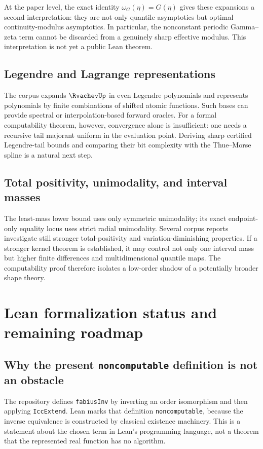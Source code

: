 \documentclass[11pt,oneside]{article}
\theoremstyle{definition}
\theoremstyle{remark}
\numberwithin{equation}{section}
\begin{document}
At the paper level, the exact identity $\omega_G(\eta)=G(\eta)$ gives these
expansions a second interpretation: they are not only quantile asymptotics but
optimal continuity-modulus asymptotics.  In particular, the nonconstant
periodic Gamma--zeta term cannot be discarded from a genuinely sharp
effective modulus.  This interpretation is not yet a public Lean theorem.

\subsection{Legendre and Lagrange representations}

The corpus expands $\RvachevUp$ in even Legendre polynomials and represents
polynomials by finite combinations of shifted atomic functions.  Such bases
can provide spectral or interpolation-based forward oracles.  For a formal
computability theorem, however, convergence alone is insufficient: one needs
a recursive tail majorant uniform in the evaluation point.  Deriving sharp
certified Legendre-tail bounds and comparing their bit complexity with the
Thue--Morse spline is a natural next step.

\subsection{Total positivity, unimodality, and interval masses}

The least-mass lower bound uses only symmetric unimodality; its exact
endpoint-only equality locus uses strict radial unimodality.  Several corpus
reports investigate still stronger total-positivity and variation-diminishing
properties.  If a stronger kernel theorem is established, it may control not
only one interval mass but higher finite differences and multidimensional
quantile maps.  The computability proof therefore isolates a low-order shadow
of a potentially broader shape theory.

\section{Lean formalization status and remaining roadmap}
\label{sec:lean-status}

\subsection{Why the present \texttt{noncomputable} definition is not an obstacle}

The repository defines \texttt{fabiusInv} by inverting an order isomorphism and
then applying \texttt{IccExtend}.  Lean marks that definition
\texttt{noncomputable}, because the inverse equivalence is constructed by
classical existence machinery.  This is a statement about the chosen term in
Lean's programming language, not a theorem that the represented real function
has no algorithm.
\end{document}
